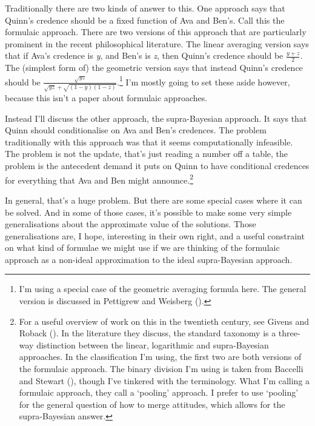 \documentclass[
  11pt,
  letterpaper,
  DIV=11,
  numbers=noendperiod,
  twoside]{scrartcl}
\begin{document}
Traditionally there are two kinds of answer to this. One approach says
that Quinn's credence should be a fixed function of Ava and Ben's. Call
this the formulaic approach. There are two versions of this approach
that are particularly prominent in the recent philosophical literature.
The linear averaging version says that if Ava's credence is \emph{y},
and Ben's is \emph{z}, then Quinn's credence should be
\(\frac{y + z}{2}\). The (simplest form of) the geometric version says
that instead Quinn's credence should be
\(\frac{\sqrt{yz}}{\sqrt{yz} + \sqrt{(1-y)(1-z)}}\).\footnote{I'm using
  a special case of the geometric averaging formula here. The general
  version is discussed in Pettigrew and Weisberg
  ().} I'm mostly going
to set these aside however, because this isn't a paper about formulaic
approaches.

Instead I'll discuss the other approach, the supra-Bayesian approach. It
says that Quinn should conditionalise on Ava and Ben's credences. The
problem traditionally with this approach was that it seems
computationally infeasible. The problem is not the update, that's just
reading a number off a table, the problem is the antecedent demand it
puts on Quinn to have conditional credences for everything that Ava and
Ben might announce.\footnote{For a useful overview of work on this in
  the twentieth century, see Givens and Roback
  (). In the literature they
  discuss, the standard taxonomy is a three-way distinction between the
  linear, logarithmic and supra-Bayesian approaches. In the
  classification I'm using, the first two are both versions of the
  formulaic approach. The binary division I'm using is taken from
  Baccelli and Stewart (),
  though I've tinkered with the terminology. What I'm calling a
  formulaic approach, they call a `pooling' approach. I prefer to use
  `pooling' for the general question of how to merge attitudes, which
  allows for the supra-Bayesian answer.}

In general, that's a huge problem. But there are some special cases
where it can be solved. And in some of those cases, it's possible to
make some very simple generalisations about the approximate value of the
solutions. Those generalisations are, I hope, interesting in their own
right, and a useful constraint on what kind of formulae we might use if
we are thinking of the formulaic approach as a non-ideal approximation
to the ideal supra-Bayesian approach.
\end{document}

